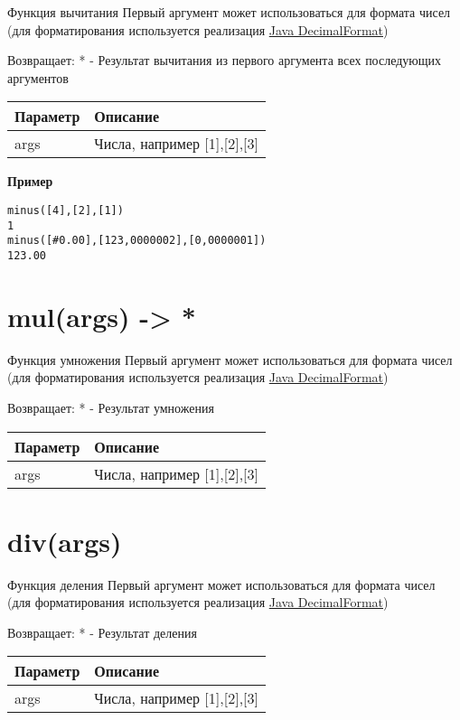 Функция вычитания Первый аргумент может использоваться для формата чисел
(для форматирования используется реализация
\href{https://docs.oracle.com/javase/7/docs/api/java/text/DecimalFormat.html}{Java
DecimalFormat})

Возвращает: * - Результат вычитания из первого аргумента всех
последующих аргументов

\begin{longtable}[]{@{}ll@{}}
\toprule
Параметр & Описание\tabularnewline
\midrule
\endhead
args & Числа, например {[}1{]},{[}2{]},{[}3{]}\tabularnewline
\bottomrule
\end{longtable}

\textbf{Пример}

\begin{verbatim}
minus([4],[2],[1])
1
minus([#0.00],[123,0000002],[0,0000001])
123.00
\end{verbatim}

\hypertarget{mulargs}{%
\section{mul(args) -> *}\label{mulargs}}

Функция умножения Первый аргумент может использоваться для формата чисел
(для форматирования используется реализация
\href{https://docs.oracle.com/javase/7/docs/api/java/text/DecimalFormat.html}{Java
DecimalFormat})

Возвращает: * - Результат умножения

\begin{longtable}[]{@{}ll@{}}
\toprule
Параметр & Описание\tabularnewline
\midrule
\endhead
args & Числа, например {[}1{]},{[}2{]},{[}3{]}\tabularnewline
\bottomrule
\end{longtable}

\hypertarget{divargs}{%
\section{div(args)}\label{divargs}}

Функция деления Первый аргумент может использоваться для формата чисел
(для форматирования используется реализация
\href{https://docs.oracle.com/javase/7/docs/api/java/text/DecimalFormat.html}{Java
DecimalFormat})

Возвращает: * - Результат деления

\begin{longtable}[]{@{}ll@{}}
\toprule
Параметр & Описание\tabularnewline
\midrule
\endhead
args & Числа, например {[}1{]},{[}2{]},{[}3{]}\tabularnewline
\bottomrule
\end{longtable}

